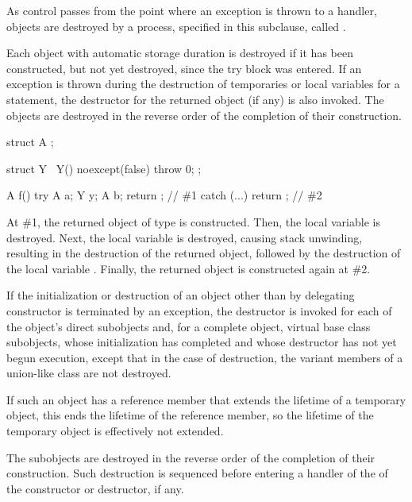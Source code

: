 \pnum
{}%
As control passes from the point where an exception is thrown
to a handler,
objects are destroyed by a process,
specified in this subclause, called .

\pnum
Each object with automatic storage duration is destroyed if it has been
constructed, but not yet destroyed,
since the try block was entered.
If an exception is thrown during the destruction of temporaries or
local variables for a  statement,
the destructor for the returned object (if any) is also invoked.
The objects are destroyed in the reverse order of the completion
of their construction.
\begin{example}
\begin{codeblock}
struct A { };

struct Y { ~Y() noexcept(false) { throw 0; } };

A f() {
  try {
    A a;
    Y y;
    A b;
    return {};      // \#1
  } catch (...) {
  }
  return {};        // \#2
}
\end{codeblock}
At \#1, the returned object of type  is constructed.
Then, the local variable  is destroyed.
Next, the local variable  is destroyed,
causing stack unwinding,
resulting in the destruction of the returned object,
followed by the destruction of the local variable .
Finally, the returned object is constructed again at \#2.
\end{example}

\pnum
If the initialization or destruction of an object
other than by delegating constructor
is terminated by an exception,
the destructor is invoked for
each of the object's direct subobjects
and, for a complete object, virtual base class subobjects,
whose initialization has completed
and whose destructor has not yet begun execution,
except that in the case of destruction, the variant members of a
union-like class are not destroyed.
\begin{note}
If such an object has a reference member
that extends the lifetime of a temporary object,
this ends the lifetime of the reference member,
so the lifetime of the temporary object is effectively not extended.
\end{note}
The subobjects are destroyed in the reverse order of the completion of
their construction. Such destruction is sequenced before entering a
handler of the  of the constructor or destructor,
if any.

